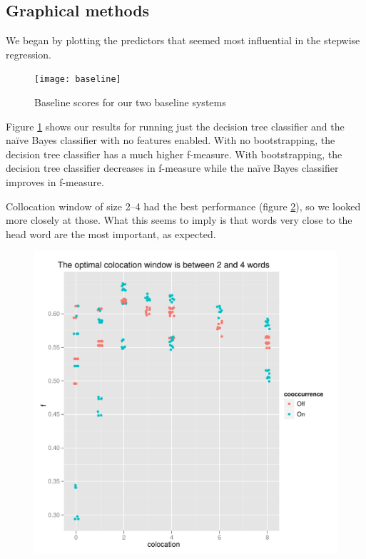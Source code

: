 \documentclass{article}
\newcommand{\naive}{na\"ive}
\begin{document}
\subsection{Graphical methods}
We began by plotting the predictors that seemed most influential in the
stepwise regression.

\begin{figure}[h]
\texttt{[image: baseline]}
\caption{\label{fig:base}Baseline scores for our two baseline systems}
\end{figure}

Figure \ref{fig:base} shows our results for running just the decision
tree classifier and the \naive{} Bayes classifier with no features
enabled. With no bootstrapping, the decision tree classifier has a
much higher f-measure. With bootstrapping, the decision tree
classifier decreases in f-measure while the \naive{} Bayes classifier
improves in f-measure.

Collocation window of size 2--4 had the best performance (figure
\ref{fig2}), so we looked more closely at those. What this seems to
imply is that words very close to the head word are the most
important, as expected.

\begin{figure}[h]
\includegraphics[width=\textwidth]{pg_0002}
\caption{\label{fig2}}
\end{figure}
\end{document}
